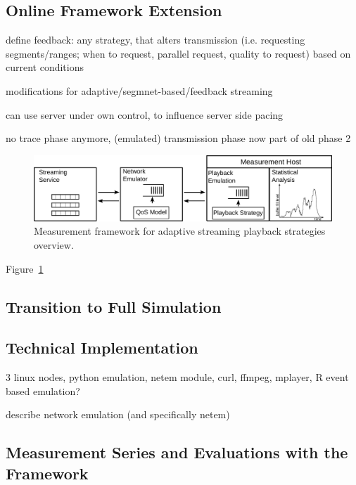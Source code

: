 


\subsection{Online Framework Extension}

define feedback: any strategy, that alters transmission (i.e. requesting segments/ranges; when to request, parallel request, quality to request) based on current conditions

modifications for adaptive/segmnet-based/feedback streaming

can use server under own control, to influence server side pacing

no trace phase anymore, (emulated) transmission phase now part of old phase 2


\begin{figure}[htb]
    \includegraphics[width=\textwidth]{images/feedback-measurement-model.pdf}
    \caption{Measurement framework for adaptive streaming playback strategies overview.}
    \label{c3:fig:framework-feedback}
\end{figure}


Figure~\ref{c3:fig:framework-feedback}


\subsection{Transition to Full Simulation}

\subsection{Technical Implementation}

3 linux nodes, python emulation, netem module, curl, ffmpeg, mplayer, R
event based emulation?

describe network emulation (and specifically netem)



\subsection{Measurement Series and Evaluations with the Framework}

